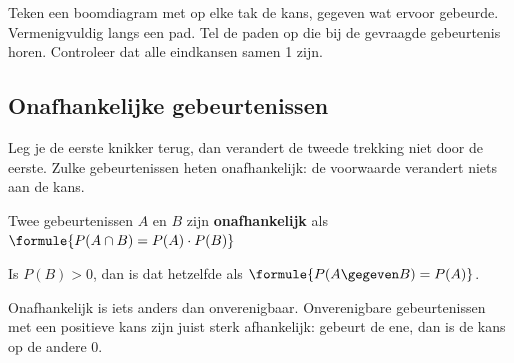 \begin{werkwijze}
Teken een boomdiagram met op elke tak de kans, gegeven wat ervoor gebeurde. Vermenigvuldig langs een pad. Tel de paden op die bij de gevraagde gebeurtenis horen. Controleer dat alle eindkansen samen 1 zijn.
\end{werkwijze}

\begin{oefeningen}

\end{oefeningen}

\subsection{Onafhankelijke gebeurtenissen}

Leg je de eerste knikker terug, dan verandert de tweede trekking niet door de eerste. Zulke gebeurtenissen heten onafhankelijk: de voorwaarde verandert niets aan de kans.

\begin{theorie}
Twee gebeurtenissen $A$ en $B$ zijn \textbf{\textcolor{accent}{onafhankelijk}} als \quad $\formule{P(A \cap B) = P(A) \cdot P(B)}$

\vspace{1mm}
Is $P(B) > 0$, dan is dat hetzelfde als $\formule{P(A \gegeven B) = P(A)}$.
\end{theorie}

Onafhankelijk is iets anders dan onverenigbaar. Onverenigbare gebeurtenissen met een positieve kans zijn juist sterk afhankelijk: gebeurt de ene, dan is de kans op de andere 0.


